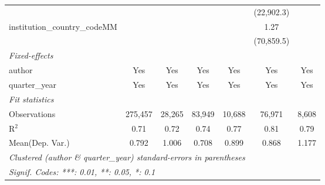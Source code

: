 \begin{tabular}{lcccccc}
                                         &                &               &                &                & (22,902.3)     &   \\   
   institution\_country\_codeMM          &                &               &                &                & 1.27           &   \\   
                                         &                &               &                &                & (70,859.5)     &   \\   
   \midrule
   \emph{Fixed-effects}\\
   author                                & Yes            & Yes           & Yes            & Yes            & Yes            & Yes\\  
   quarter\_year                         & Yes            & Yes           & Yes            & Yes            & Yes            & Yes\\  
   \midrule
   \emph{Fit statistics}\\
   Observations                          & 275,457        & 28,265        & 83,949         & 10,688         & 76,971         & 8,608\\  
   R$^2$                                 & 0.71           & 0.72          & 0.74           & 0.77           & 0.81           & 0.79\\  
Mean(Dep. Var.) & 0.792 & 1.006 & 0.708 & 0.899 & 0.868 & 1.177 \\
   \midrule \midrule
   \multicolumn{7}{l}{\emph{Clustered (author \& quarter\_year) standard-errors in parentheses}}\\
   \multicolumn{7}{l}{\emph{Signif. Codes: ***: 0.01, **: 0.05, *: 0.1}}\\
\end{tabular}
\par\endgroup
